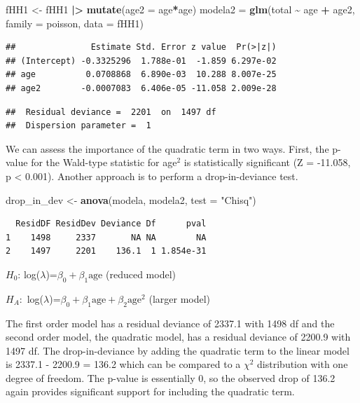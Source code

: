 \documentclass[
]{krantz}
\newenvironment{Shaded}{\begin{snugshade}}{\end{snugshade}}
\newcommand{\AttributeTok}[1]{\textcolor[rgb]{0.27,0.27,0.27}{#1}}
\newcommand{\FunctionTok}[1]{\textcolor[rgb]{0.27,0.27,0.27}{\textbf{#1}}}
\newcommand{\NormalTok}[1]{#1}
\newcommand{\OtherTok}[1]{\textcolor[rgb]{0.37,0.37,0.37}{#1}}
\newcommand{\SpecialCharTok}[1]{\textcolor[rgb]{0.43,0.43,0.43}{\textbf{#1}}}
\newcommand{\StringTok}[1]{\textcolor[rgb]{0.5,0.5,0.5}{#1}}
\begin{document}
\begin{Shaded}
\begin{Highlighting}[]
\NormalTok{fHH1 }\OtherTok{\textless{}{-}}\NormalTok{ fHH1 }\SpecialCharTok{|\textgreater{}} \FunctionTok{mutate}\NormalTok{(}\AttributeTok{age2 =}\NormalTok{ age}\SpecialCharTok{*}\NormalTok{age)}
\NormalTok{modela2 }\OtherTok{=} \FunctionTok{glm}\NormalTok{(total }\SpecialCharTok{\textasciitilde{}}\NormalTok{ age }\SpecialCharTok{+}\NormalTok{ age2, }\AttributeTok{family =}\NormalTok{ poisson, }
              \AttributeTok{data =}\NormalTok{ fHH1)}
\end{Highlighting}
\end{Shaded}

\begin{verbatim}
##               Estimate Std. Error z value  Pr(>|z|)
## (Intercept) -0.3325296  1.788e-01  -1.859 6.297e-02
## age          0.0708868  6.890e-03  10.288 8.007e-25
## age2        -0.0007083  6.406e-05 -11.058 2.009e-28
\end{verbatim}

\begin{verbatim}
##  Residual deviance =  2201  on  1497 df 
##  Dispersion parameter =  1
\end{verbatim}

We can assess the importance of the quadratic term in two ways. First, the p-value for the Wald-type statistic for age\(^2\) is statistically significant (Z = -11.058, p \textless{} 0.001). Another approach is to perform a drop-in-deviance test.

\begin{Shaded}
\begin{Highlighting}[]
\NormalTok{drop\_in\_dev }\OtherTok{\textless{}{-}} \FunctionTok{anova}\NormalTok{(modela, modela2, }\AttributeTok{test =} \StringTok{"Chisq"}\NormalTok{)}
\end{Highlighting}
\end{Shaded}

\begin{verbatim}
  ResidDF ResidDev Deviance Df      pval
1    1498     2337       NA NA        NA
2    1497     2201    136.1  1 1.854e-31
\end{verbatim}

\(H_0\): log(\(\lambda\))=\(\beta_0+\beta_1 \textrm{age}\) (reduced model)

\(H_A:\) log(\(\lambda\))=\(\beta_0+\beta_1 \textrm{age} + \beta_2 \textrm{age}^2\) (larger model)

The first order model has a residual deviance of 2337.1 with 1498 df and the second order model, the quadratic model, has a residual deviance of 2200.9 with 1497 df. The drop-in-deviance by adding the quadratic term to the linear model is 2337.1 - 2200.9 = 136.2 which can be compared to a \(\chi^2\) distribution with one degree of freedom. The p-value is essentially 0, so the observed drop of 136.2 again provides significant support for including the quadratic term.
\end{document}
